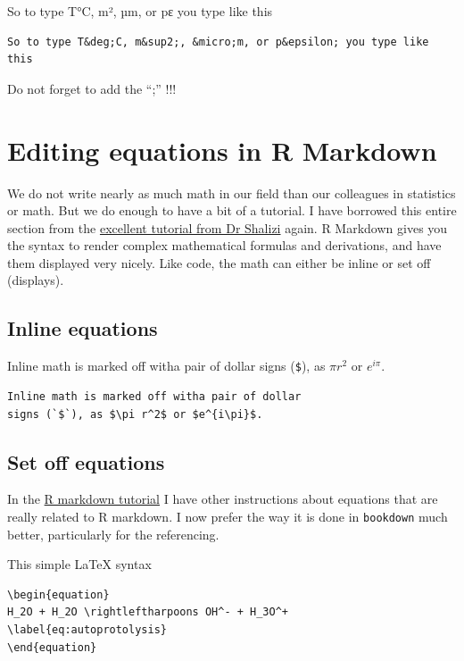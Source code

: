 \documentclass[]{book}
\theoremstyle{definition}
\theoremstyle{definition}
\theoremstyle{definition}
\theoremstyle{remark}
\begin{document}
So to type T°C, m², µm, or pε you type like this

\begin{verbatim}
So to type T&deg;C, m&sup2;, &micro;m, or p&epsilon; you type like this
\end{verbatim}

Do not forget to add the ``;'' !!!

\chapter{Editing equations in R
Markdown}\label{editing-equations-in-r-markdown}

We do not write nearly as much math in our field than our colleagues in
statistics or math. But we do enough to have a bit of a tutorial. I have
borrowed this entire section from the
\href{http://www.stat.cmu.edu/~cshalizi/rmarkdown/\#math-in-r-markdown}{excellent
tutorial from Dr Shalizi} again. R Markdown gives you the syntax to
render complex mathematical formulas and derivations, and have them
displayed very nicely. Like code, the math can either be inline or set
off (displays).

\hypertarget{inline-equations}{\section{Inline
equations}\label{inline-equations}}

Inline math is marked off witha pair of dollar signs (\texttt{\$}), as
\(\pi r^2\) or \(e^{i\pi}\).

\begin{verbatim}
Inline math is marked off witha pair of dollar
signs (`$`), as $\pi r^2$ or $e^{i\pi}$.
\end{verbatim}

\section{Set off equations}\label{set-off-equations}

In the
\href{https://francoisbirgand.github.io/tutorial-RMarkdown_instructions.html}{R
markdown tutorial} I have other instructions about equations that are
really related to R markdown. I now prefer the way it is done in
\texttt{bookdown} much better, particularly for the referencing.

This simple LaTeX syntax

\begin{verbatim}
\begin{equation}
H_2O + H_2O \rightleftharpoons OH^- + H_3O^+
\label{eq:autoprotolysis}
\end{equation}
\end{verbatim}
\end{document}
